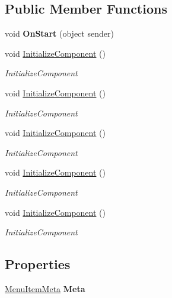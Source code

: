 \subsection*{Public Member Functions}
\begin{DoxyCompactItemize}
\item 
\mbox{\label{class_t_h_b___plugin___lesson_1_1_lesson_board_aabdbd8844a5616d7a9423df08ec4e5cb}} 
void {\bfseries On\+Start} (object sender)
\item 
void \mbox{\hyperlink{class_t_h_b___plugin___lesson_1_1_lesson_board_aa22da2f78d4cfce95489bdb60c943438}{Initialize\+Component}} ()
\begin{DoxyCompactList}\small\item\em Initialize\+Component \end{DoxyCompactList}\item 
void \mbox{\hyperlink{class_t_h_b___plugin___lesson_1_1_lesson_board_aa22da2f78d4cfce95489bdb60c943438}{Initialize\+Component}} ()
\begin{DoxyCompactList}\small\item\em Initialize\+Component \end{DoxyCompactList}\item 
void \mbox{\hyperlink{class_t_h_b___plugin___lesson_1_1_lesson_board_aa22da2f78d4cfce95489bdb60c943438}{Initialize\+Component}} ()
\begin{DoxyCompactList}\small\item\em Initialize\+Component \end{DoxyCompactList}\item 
void \mbox{\hyperlink{class_t_h_b___plugin___lesson_1_1_lesson_board_aa22da2f78d4cfce95489bdb60c943438}{Initialize\+Component}} ()
\begin{DoxyCompactList}\small\item\em Initialize\+Component \end{DoxyCompactList}\item 
void \mbox{\hyperlink{class_t_h_b___plugin___lesson_1_1_lesson_board_aa22da2f78d4cfce95489bdb60c943438}{Initialize\+Component}} ()
\begin{DoxyCompactList}\small\item\em Initialize\+Component \end{DoxyCompactList}\end{DoxyCompactItemize}
\subsection*{Properties}
\begin{DoxyCompactItemize}
\item 
\mbox{\hyperlink{class_uniform_client_1_1_plugins_1_1_menu_item_meta}{Menu\+Item\+Meta}} {\bfseries Meta}
\end{DoxyCompactItemize}
